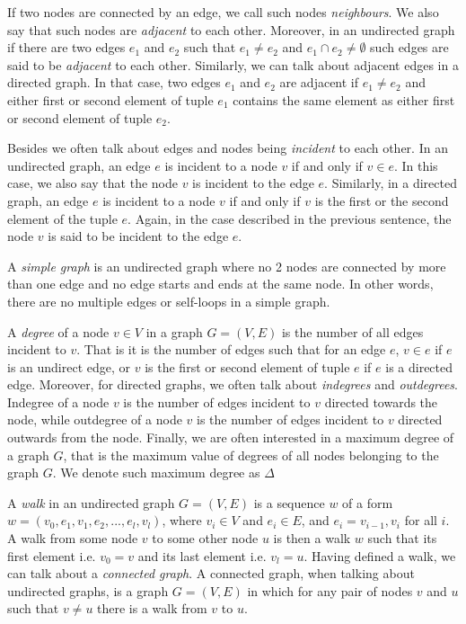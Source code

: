 If two nodes are connected by an edge, we call such nodes \emph{neighbours}. We
also say that such nodes are \emph{adjacent} to each other. Moreover, in an undirected graph
if there are two edges $e_1$ and $e_2$ such that $e_1 \neq e_2$ and $e_1 \cap e_2 \neq \emptyset$
such edges are said to be \emph{adjacent} to each other. Similarly, we can talk about adjacent 
edges in a directed graph. In that case, two edges $e_1$ and $e_2$ are adjacent if
$e_1 \neq e_2$ and either first or second element of tuple $e_1$ contains the same
element as either first or second element of tuple $e_2$.

Besides we often talk about edges and nodes being \emph{incident} to each other.
In an undirected graph, an edge $e$ is incident to a node $v$ if and only if $v \in e$. In this
case, we also say that the node $v$ is incident to the edge $e$. Similarly, in a
directed graph, an edge $e$ is incident to a node $v$ if and only if $v$ is the
first or the second element of the tuple $e$. Again, in the case described in the
previous sentence, the node $v$ is said to be incident to the edge $e$.

A \emph{simple graph} is an undirected graph where no 2 nodes are connected by more
than one edge and no edge starts and ends at the same node. In other words, there are
no multiple edges or self-loops in a simple graph.

A \emph{degree} of a node $v \in V$ in a graph $G = (V, E)$ is the number of all
edges incident to $v$. That is it is the number of edges such that for an edge
$e$, $v \in e$ if $e$ is an undirect edge, or $v$ is the first or second element of
tuple $e$ if $e$ is a directed edge. Moreover, for directed graphs, we often talk
about \emph{indegrees} and \emph{outdegrees}. Indegree of a node $v$ is the number
of edges incident to $v$ directed towards the node, while outdegree of a node $v$ is the 
number of edges incident to $v$ directed outwards from the node. Finally, we are 
often interested in a maximum degree of a graph $G$, that is the maximum value of
degrees of all nodes belonging to the graph $G$. We denote such maximum degree as
$\Delta$

A \emph{walk} in an undirected graph $G = (V, E)$ is a sequence $w$ of a form
$w = (v_0, e_1, v_1, e_2, ..., e_l, v_l)$,
where $v_i \in V$ and $e_i \in E$, and $e_i = {v_{i-1}, v_i}$ for all $i$. A walk from some
node $v$ to some other node $u$ is then a walk $w$ such that its first element i.e. $v_0 = v$
and its last element i.e. $v_l = u$. Having defined a walk, we can talk about a \emph{
connected graph}. A connected graph, when talking about undirected
graphs, is a graph $G = (V, E)$ in which for any pair of nodes $v$ and $u$ such that
$v \neq u$ there is a walk from $v$ to $u$.

